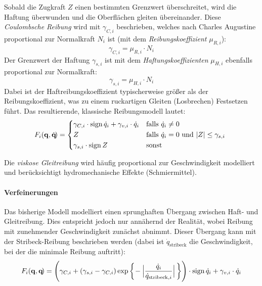 				Sobald die Zugkraft \(Z\) einen bestimmten Grenzwert überschreitet, wird die Haftung überwunden und die Oberflächen gleiten übereinander. Diese \emph{Coulombsche Reibung} wird mit \( \gamma_{C, i} \) beschrieben, welches nach Charles Augustine proportional zur Normalkraft \( N_i \) ist (mit dem \emph{Reibungskoeffizient} \( \mu_{R, i} \)):
				\begin{equation*}
					\gamma_{C, i} = \mu_{R, i} \cdot N_i
				\end{equation*}
				Der Grenzwert der Haftung \( \gamma_{s, i} \) ist mit dem \emph{Haftungskoeffizienten} \( \mu_{H, i} \) ebenfalls proportional zur Normalkraft:
				\begin{equation*}
					\gamma_{s, i} = \mu_{H, i} \cdot N_i
				\end{equation*}
				Dabei ist der Haftreibungskoeffizient typischerweise größer als der Reibungskoeffizient, was zu einem ruckartigen Gleiten (Losbrechen) \bzw Festsetzen führt. Das resultierende, klassische Reibungsmodell lautet:
				\begin{equation*}
					F_i(\vec{q}, \dot{\vec{q}}\!) =
						\begin{cases*}
							\gamma_{C, i} \cdot \sign \dot{q}_i + \gamma_{v, i} \cdot \dot{q}_i & falls \( \dot{q}_i \neq 0 \) \\
							Z                                                                   & falls \( \dot{q}_i = 0 \) und \( \lvert Z \rvert \leq \gamma_{s, i} \) \\
							\gamma_{s, i} \cdot \sign Z                                         & sonst
						\end{cases*}
				\end{equation*}
				
				Die \emph{viskose Gleitreibung} wird häufig proportional zur Geschwindigkeit modelliert und berücksichtigt hydromechanische Effekte (\zB Schmiermittel).
				
				\paragraph{Verfeinerungen}
					Das bisherige Modell modelliert einen sprunghaften Übergang zwischen Haft- und Gleitreibung. Dies entspricht jedoch nur annähernd der Realität, wobei Reibung mit zunehmender Geschwindigkeit zunächst abnimmt. Dieser Übergang kann mit der Stribeck-Reibung beschrieben werden (dabei ist \( \dot{q}_\text{stribeck} \) die Geschwindigkeit, bei der die minimale Reibung auftritt):
					\begin{equation*}
						F_i(\boldsymbol{\mathrm{q}}, \boldsymbol{\mathrm{q}}\!) = \Bigg( \gamma_{C, i} + (\gamma_{s, i} - \gamma_{C, i}) \exp \bigg\{\! -\Big\lvert \frac{\dot{q}_i}{\dot{q}_{\text{stribeck}, i}} \Big\rvert \,\bigg\} \Bigg) \cdot \operatorname{sign} \dot{q}_i + \gamma_{v, i} \cdot \dot{q}_i
					\end{equation*}
				

